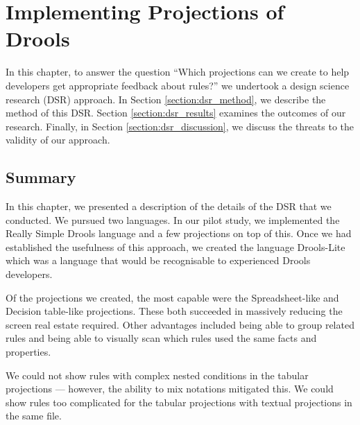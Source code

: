 \chapter{Implementing Projections of Drools}
\label{chapter:DSR}

In this chapter, to answer the question ``Which projections can we create to help developers get appropriate feedback about rules?'' we undertook a design science research (DSR) approach.
In Section \ref{section:dsr_method}, we describe the method of this DSR.
Section \ref{section:dsr_results} examines the outcomes of our research.
Finally, in Section \ref{section:dsr_discussion}, we discuss the threats to the validity of our approach.







\section{Summary}
In this chapter, we presented a description of the details of the DSR that we conducted.
We pursued two languages.
In our pilot study, we implemented the Really Simple Drools language and a few projections on top of this.
Once we had established the usefulness of this approach, we created the language Drools-Lite which was a language that would be recognisable to experienced Drools developers.

Of the projections we created, the most capable were the Spreadsheet-like and Decision table-like projections.
These both succeeded in massively reducing the screen real estate required.
Other advantages included being able to group related rules and being able to visually scan which rules used the same facts and properties.

We could not show rules with complex nested conditions in the tabular projections — however, the ability to mix notations mitigated this.
We could show rules too complicated for the tabular projections with textual projections in the same file.